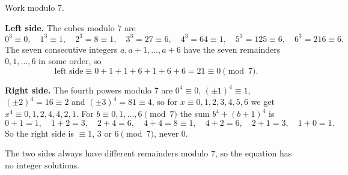 Work modulo $7$.

\textbf{Left side.} The cubes modulo $7$ are
\[
0^3\equiv0,\quad 1^3\equiv1,\quad 2^3=8\equiv1,\quad 3^3=27\equiv6,\quad 4^3=64\equiv1,\quad 5^3=125\equiv6,\quad 6^3=216\equiv6 .
\]
The seven consecutive integers $a,a+1,\dots,a+6$ have the seven remainders $0,1,\dots,6$ in some order, so
\[
\text{left side}\equiv0+1+1+6+1+6+6=21\equiv0\pmod7 .
\]

\textbf{Right side.} The fourth powers modulo $7$ are $0^4\equiv0$, $(\pm1)^4\equiv1$, $(\pm2)^4=16\equiv2$ and $(\pm3)^4=81\equiv4$, so for $x\equiv0,1,2,3,4,5,6$ we get $x^4\equiv0,1,2,4,4,2,1$. For $b\equiv0,1,\dots,6\pmod 7$ the sum $b^4+(b+1)^4$ is
\[
0+1=1,\quad 1+2=3,\quad 2+4=6,\quad 4+4=8\equiv1,\quad 4+2=6,\quad 2+1=3,\quad 1+0=1 .
\]
So the right side is $\equiv1$, $3$ or $6\pmod7$, never $0$.

The two sides always have different remainders modulo $7$, so the equation has $\boxed{\text{no integer solutions}}$.
